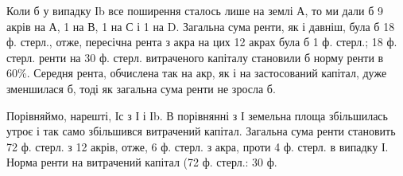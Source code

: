 Коли б у випадку Іb все поширення сталось лише на землі А, то ми
дали б 9 акрів на А, 1 на В, 1 на С і 1 на D. Загальна сума ренти, як і давніш,
була б 18 ф. стерл., отже, пересічна рента з акра на цих 12 акрах
була б 1 ф. стерл.; 18 ф. стерл. ренти на 30 ф. стерл. витраченого капіталу
становили б норму ренти в 60\%. Середня рента, обчислена так на акр,
як і на застосований капітал, дуже зменшилася б, тоді як загальна сума ренти
не зросла б.

Порівняймо, нарешті, Іс з І і Іb. В порівнянні з І земельна площа збільшилась
утроє і так само збільшився витрачений капітал. Загальна сума ренти
становить 72 ф. стерл. з 12 акрів, отже, 6 ф. стерл. з акра, проти 4 ф.
стерл. в випадку І. Норма ренти на витрачений капітал (72 ф. стерл.: 30 ф.
\parbreak{}  %
